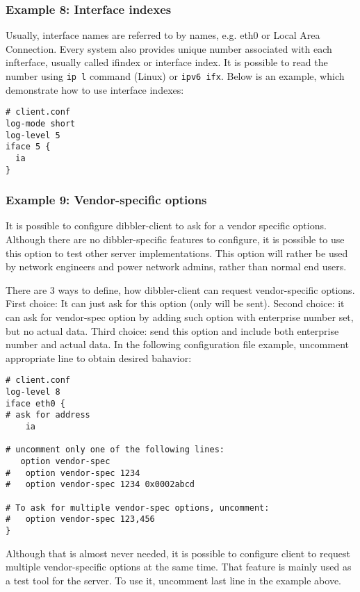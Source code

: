 \subsubsection{Example 8: Interface indexes}
Usually, interface names are referred to by names, e.g. eth0 or Local
Area Connection. Every system also provides unique number associated
with each infterface, usually called ifindex or interface index. It is
possible to read the number using \verb+ip l+ command (Linux) or
\verb+ipv6 ifx+. Below is an example, which demonstrate how to use
interface indexes:

\begin{lstlisting}
# client.conf
log-mode short
log-level 5
iface 5 {
  ia
}
\end{lstlisting}

\subsubsection{Example 9: Vendor-specific options}
\label{example-client-vendor-spec}
It is possible to configure dibbler-client to ask for a vendor specific
options. Although there are no dibbler-specific features to configure,
it is possible to use this option to test other server
implementations. This option will rather be used by network engineers
and power network admins, rather than normal end users. 

There are 3 ways to define, how dibbler-client can request
vendor-specific options. First choice: It can just ask for this option (only 
 will be sent). Second choice: it can ask for
vendor-spec option by adding such option with enterprise number set, but
no actual data. Third choice: send this option and include both
enterprise number and actual data. In the following configuration file
example, uncomment appropriate line to obtain desired bahavior:

\begin{lstlisting}
# client.conf
log-level 8
iface eth0 {
# ask for address
    ia

# uncomment only one of the following lines:
   option vendor-spec
#   option vendor-spec 1234
#   option vendor-spec 1234 0x0002abcd

# To ask for multiple vendor-spec options, uncomment:
#   option vendor-spec 123,456
}
\end{lstlisting}

Although that is almost never needed, it is possible to configure
client to request multiple vendor-specific options at the same
time. That feature is mainly used as a test tool for the server. To
use it, uncomment last line in the example above.

